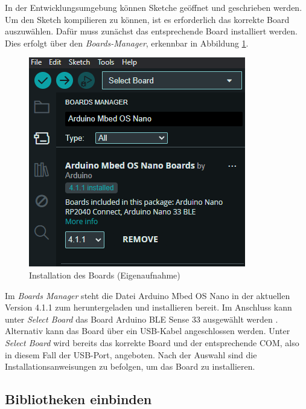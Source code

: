 In der Entwicklungsumgebung können  Sketche geöffnet und geschrieben werden. Um den Sketch kompilieren zu können, ist es erforderlich das korrekte Board auszuwählen.
Dafür muss zunächst das entsprechende Board installiert werden. 
Dies erfolgt über den \textit{Boards-Manager}, erkennbar in Abbildung \ref{Boardsmanager}.
 
\begin{figure}[H]
	\begin{center}
		\includegraphics[width=\textwidth]{Images/IDE/Boardsmanager} 
		\caption{Installation des Boards (Eigenaufnahme)} \label{Boardsmanager}
	\end{center}
\end{figure}

Im \textit{Boards Manager} steht die Datei Arduino Mbed OS Nano in der aktuellen Version 4.1.1 zum heruntergeladen und installieren bereit. Im Anschluss kann unter \textit{Select Board} das Board Arduino BLE Sense 33 ausgewählt werden \cite{ArdIDE.2024b}.
Alternativ kann das Board über ein USB-Kabel angeschlossen werden. Unter\textit{ Select Board} wird bereits das korrekte Board und der entsprechende COM, also in diesem Fall der USB-Port, angeboten. Nach der Auswahl sind die Installationsanweisungen zu befolgen, um das Board zu installieren.

\subsection{Bibliotheken einbinden}

